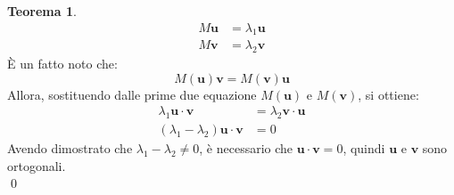 \documentclass[10pt,a4paper]{article}
\theoremstyle{plain}
\theoremstyle{definition}
\newtheorem{teorema}[subsection]{Teorema}
\begin{document}
\begin{teorema}
\begin{align*}
M\mathbf{u}&=\lambda_1 \mathbf{u} \\
M\mathbf{v}&=\lambda_2 \mathbf{v} 
\end{align*}
È un fatto noto che:
\[
M(\mathbf{u})\mathbf{v}=M(\mathbf{v})\mathbf{u}
\]
Allora, sostituendo dalle prime due equazione $M(\mathbf{u})$ e $M(\mathbf{v})$, si ottiene:
\begin{align*}
\lambda_1 \mathbf{u} \cdot\mathbf{v} &= \lambda_2 \mathbf{v}\cdot\mathbf{u} \\
(\lambda_1 - \lambda_2)\mathbf{u}\cdot\mathbf{v} &=0
\end{align*}
Avendo dimostrato che 
$\lambda_1 - \lambda_2 \ne 0$, è necessario che $\mathbf{u}\cdot\mathbf{v}=0$, quindi $\mathbf{u}$ e $\mathbf{v}$ sono ortogonali.\\ \qed
\end{teorema}
\end{document}
